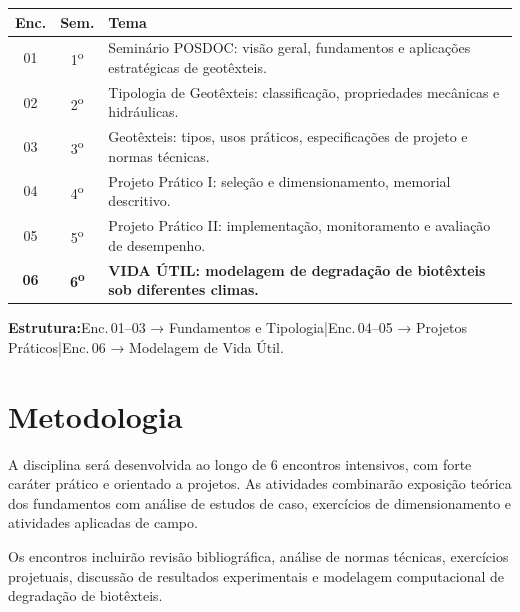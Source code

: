 \documentclass[11pt,a4paper]{article}
\begin{document}
\begin{small}
\renewcommand{\arraystretch}{1.35}
\begin{tabularx}{\textwidth}{@{}c c X@{}}
\toprule
\textbf{Enc.} & \textbf{Sem.} & \textbf{Tema} \\
\midrule
01 & 1\textsuperscript{o} & Seminário POSDOC: visão geral, fundamentos e aplicações estratégicas de geotêxteis. \\
02 & 2\textsuperscript{o} & Tipologia de Geotêxteis: classificação, propriedades mecânicas e hidráulicas. \\
03 & 3\textsuperscript{o} & Geotêxteis: tipos, usos práticos, especificações de projeto e normas técnicas. \\
04 & 4\textsuperscript{o} & Projeto Prático I: seleção e dimensionamento, memorial descritivo. \\
05 & 5\textsuperscript{o} & Projeto Prático II: implementação, monitoramento e avaliação de desempenho. \\
\rowcolor{uefslight!70!white}
\textbf{06} & \textbf{6\textsuperscript{o}} & \textbf{\textsf{VIDA ÚTIL}: modelagem de degradação de biotêxteis sob diferentes climas.} \\
\bottomrule
\end{tabularx}
\end{small}

\begin{tcolorbox}[uefsbox]
\textbf{Estrutura:}\enspace Enc.\,01--03 → Fundamentos e Tipologia\enspace|\enspace Enc.\,04--05 → Projetos Práticos\enspace|\enspace Enc.\,06 → Modelagem de Vida Útil.
\end{tcolorbox}


\section*{Metodologia}

A disciplina será desenvolvida ao longo de 6 encontros intensivos, com forte caráter prático e orientado a projetos. As atividades combinarão exposição teórica dos fundamentos com análise de estudos de caso, exercícios de dimensionamento e atividades aplicadas de campo.

Os encontros incluirão revisão bibliográfica, análise de normas técnicas, exercícios projetuais, discussão de resultados experimentais e modelagem computacional de degradação de biotêxteis.
\end{document}
